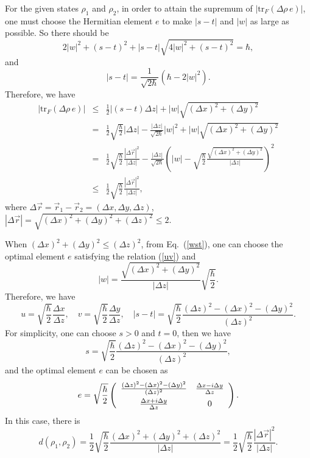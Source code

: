\documentclass[a4paper,12pt]{article}
\begin{document}
For the given states $\rho_1$ and $\rho_2$, in order to attain the supremum of $|\mathrm{tr}_{F}(\Delta\rho\, e)|$, one must choose the Hermitian element $e$ to make $|s-t|$ and $|w|$ as large as possible. So there should be
\begin{equation}
	2|w|^2+(s-t)^2+|s-t|\sqrt{4|w|^2+(s-t)^2}=\hbar,
\end{equation}
and
\begin{equation}
	|s-t|=\frac{1}{\sqrt{2\hbar}}(\hbar-2|w|^2).
\end{equation}
Therefore, we have
\begin{eqnarray}
	|\mathrm{tr}_{F}(\Delta\rho\, e)|
	&\leqslant&\frac{1}{2}|(s-t)\Delta z|
	+|w|\sqrt{(\Delta x)^2+(\Delta y)^2}\nonumber\\
	&=&\frac{1}{2}\sqrt{\frac{\hbar}{2}}|\Delta z|-\frac{|\Delta z|}{\sqrt{2\hbar}}|w|^2
	+|w|\sqrt{(\Delta x)^2+(\Delta y)^2}\nonumber\\
	&=&\frac{1}{2}\sqrt{\frac{\hbar}{2}}\frac{|\Delta \vec{r}|^2}{|\Delta z|}
	-\frac{|\Delta z|}{\sqrt{2\hbar}}\left(|w|
	-\sqrt{\frac{\hbar}{2}}\frac{\sqrt{(\Delta x)^2+(\Delta y)^2}}{|\Delta z|}\right)^2\nonumber\\
	&\leqslant&\frac{1}{2}\sqrt{\frac{\hbar}{2}}\frac{|\Delta \vec{r}|^2}{|\Delta z|},
\end{eqnarray}
where $\Delta \vec{r}=\vec{r}_1-\vec{r}_2=(\Delta x, \Delta y, \Delta z)$, $|\Delta \vec{r}|=\sqrt{(\Delta x)^2+(\Delta y)^2+(\Delta z)^2}\leqslant 2$.

When
$(\Delta x)^2+(\Delta y)^2\leqslant (\Delta z)^2$, from Eq.~(\ref{wst}), 
one can choose the optimal element $e$ satisfying the relation (\ref{uv}) and
\begin{equation}\label{ww}
	|w|
	=\frac{\sqrt{(\Delta x)^2+(\Delta y)^2}}{|\Delta z|}\sqrt{\frac{\hbar}{2}}.
\end{equation}
Therefore, we have
\begin{equation}
	u=\sqrt{\frac{\hbar}{2}}\frac{\Delta x}{\Delta z},\quad v=\sqrt{\frac{\hbar}{2}}\frac{\Delta y}{\Delta z},\quad
	|s-t|=\sqrt{\frac{\hbar}{2}}\frac{(\Delta z)^2-(\Delta x)^2-(\Delta y)^2}{(\Delta z)^2}.
\end{equation}
For simplicity, one can choose $s>0$ and $t=0$, then we have
\begin{equation}
	s=\sqrt{\frac{\hbar}{2}}\frac{(\Delta z)^2-(\Delta x)^2-(\Delta y)^2}{(\Delta z)^2},
\end{equation}
and the optimal element $e$ can be chosen as
\begin{equation}
	e=\sqrt{\frac{\hbar}{2}}\left(
	\begin{array}{cc}
		\frac{(\Delta z)^2-(\Delta x)^2-(\Delta y)^2}{(\Delta z)^2} & \frac{\Delta x-{\rm i}\Delta y}{\Delta z} \\[0.5em]
		\frac{\Delta x+{\rm i}\Delta y}{\Delta z} & 0 \end{array}
	\right).
\end{equation}
In this case, there is
\begin{equation}\label{sd1}
	d(\rho_1,\rho_2)
	=\frac{1}{2}\sqrt{\frac{\hbar}{2}}\frac{(\Delta x)^2+(\Delta y)^2+(\Delta z)^2}{|\Delta z|}
	=\frac{1}{2}\sqrt{\frac{\hbar}{2}}\frac{|\Delta \vec{r}|^2}{|\Delta z|}.
\end{equation}
\end{document}
